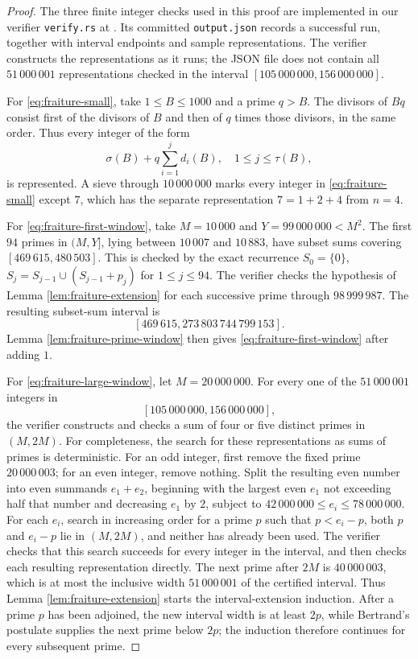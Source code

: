 \documentclass[11pt,letterpaper,reqno]{amsart}
\numberwithin{equation}{section}
\theoremstyle{remark}
\renewcommand{\leq}{\leqslant}
\begin{document}
\begin{proof}
The three finite integer checks used in this proof are implemented in
our verifier \texttt{verify.rs} at \cite{FraitureVerifier}. Its committed \texttt{output.json} records a successful
run, together with interval endpoints and sample representations. The verifier
constructs the representations as it runs; the JSON file does not contain all
$51\,000\,001$ representations checked in the interval
$[105\,000\,000,156\,000\,000]$.

For \eqref{eq:fraiture-small}, take $1\leq B\leq1000$ and a prime $q>B$.
The divisors of $Bq$ consist first of the divisors of $B$ and then of $q$
times those divisors, in the same order. Thus every integer of the form
\[
 \sigma(B)+q\sum_{i=1}^j d_i(B),
 \quad 1\leq j\leq\tau(B),
\]
is represented. A sieve through $10\,000\,000$ marks every integer in
\eqref{eq:fraiture-small} except $7$, which has the separate
representation $7=1+2+4$ from $n=4$.

For \eqref{eq:fraiture-first-window}, take $M=10\,000$ and
$Y=99\,000\,000<M^2$. The first $94$ primes in $(M,Y]$, lying between
$10\,007$ and $10\,883$, have subset sums covering
$[469\,615,480\,503]$. This is checked by the exact recurrence
$S_0=\{0\}$, $S_j=S_{j-1}\cup(S_{j-1}+p_j)$ for $1\leq j\leq94$.
The verifier checks the hypothesis of
Lemma \ref{lem:fraiture-extension} for each successive prime through
$98\,999\,987$. The resulting subset-sum interval is
\[
 [469\,615,273\,803\,744\,799\,153].
\]
Lemma \ref{lem:fraiture-prime-window} then gives
\eqref{eq:fraiture-first-window} after adding $1$.

For \eqref{eq:fraiture-large-window}, let $M=20\,000\,000$.
For every one of the $51\,000\,001$ integers in
\[
 [105\,000\,000,156\,000\,000],
\]
the verifier constructs and checks a sum of four or five distinct primes
in $(M,2M)$. For completeness, the search for these representations as sums of primes is deterministic.
For an odd integer, first remove the fixed prime $20\,000\,003$;
for an even integer, remove nothing. Split the resulting even number into
even summands $e_1+e_2$, beginning with the largest even $e_1$ not exceeding
half that number and decreasing $e_1$ by $2$, subject to
$42\,000\,000\leq e_i\leq78\,000\,000$.
For each $e_i$, search in increasing order for a prime $p$ such that
$p<e_i-p$, both $p$ and $e_i-p$ lie in $(M,2M)$, and neither has already
been used. The verifier checks that this search succeeds for every integer in the interval,
and then checks each resulting representation directly.
The next prime after $2M$ is $40\,000\,003$, which is at
most the inclusive width $51\,000\,001$ of the certified interval. Thus
Lemma \ref{lem:fraiture-extension} starts the interval-extension
induction. After a prime $p$ has been adjoined, the new interval width is
at least $2p$, while Bertrand's postulate supplies the next prime below
$2p$; the induction therefore continues for every subsequent prime.


\end{proof}
\end{document}
